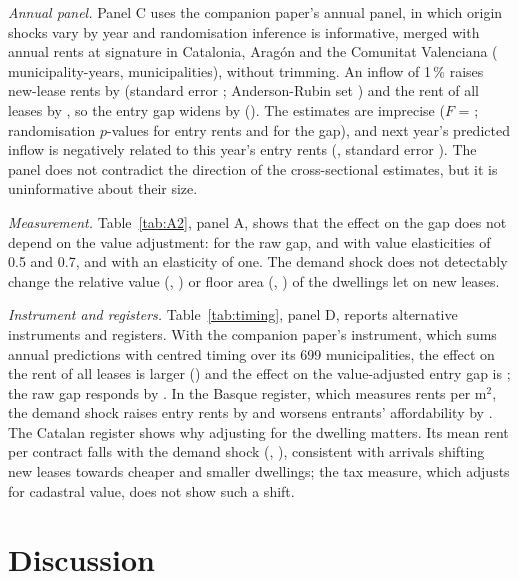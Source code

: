 \documentclass[11pt,a4paper]{article}
\begin{document}
\textit{Annual panel.} Panel C uses the companion paper's annual panel, in which origin shocks vary by year and randomisation inference is informative, merged with annual rents at signature in Catalonia, Aragón and the Comunitat Valenciana (\pnN{} municipality-years, \pnMunis{} municipalities), without trimming. An inflow of 1\,\% raises new-lease rents by \pnNew{} (standard error \pnNewSe; Anderson-Rubin set \pnNewAR) and the rent of all leases by \pnStock, so the entry gap widens by \pnGap{} (\pnGapSe). The estimates are imprecise ($F$ = \pnF; randomisation $p$-values \pnRIpNew{} for entry rents and \pnRIpGap{} for the gap), and next year's predicted inflow is negatively related to this year's entry rents (\pnLead, standard error \pnLeadSe). The panel does not contradict the direction of the cross-sectional estimates, but it is uninformative about their size.

\textit{Measurement.} Table~\ref{tab:A2}, panel A, shows that the effect on the gap does not depend on the value adjustment: \vaZero{} for the raw gap, \vaHalf{} and \vaSeven{} with value elasticities of 0.5 and 0.7, and \bGap{} with an elasticity of one. The demand shock does not detectably change the relative value (\vaCompV, \vaCompVAR) or floor area (\vaCompM, \vaCompMAR) of the dwellings let on new leases.

\textit{Instrument and registers.} Table~\ref{tab:timing}, panel D, reports alternative instruments and registers. With the companion paper's instrument, which sums annual predictions with centred timing over its 699 municipalities, the effect on the rent of all leases is larger (\ciStock) and the effect on the value-adjusted entry gap is \ciGap{} \ciGapAR; the raw gap responds by \ciGapRaw{} \ciGapRawAR. In the Basque register, which measures rents per m$^2$, the demand shock raises entry rents by \basIv{} \basIvAR{} and worsens entrants' affordability by \basAE{} \basAEAR. The Catalan register shows why adjusting for the dwelling matters. Its mean rent per contract falls with the demand shock (\catIv, \catIvAR), consistent with arrivals shifting new leases towards cheaper and smaller dwellings; the tax measure, which adjusts for cadastral value, does not show such a shift.



\section{Discussion}\label{sec:discussion}
\end{document}
